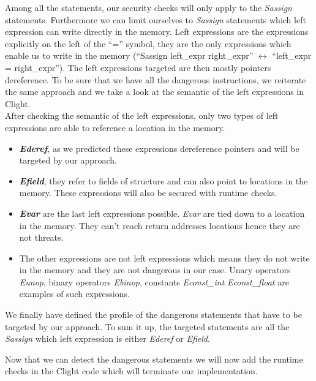 \documentclass[11pt]{sdm}
\begin{document}
Among all the statements, our security checks will only apply to the \textit{Sassign} statements.
Furthermore we can limit ourselves to \textit{Sassign} statements which left expression can write directly in the memory. Left expressions are the expressions explicitly on the left of the ``='' symbol, they are the only expressions which enable us to write in the memory (``Sassign left\_expr right\_expr'' $\leftrightarrow$ ``left\_expr = right\_expr''). The left expressions targeted are then mostly pointers dereference. To be sure that we have all the dangerous instructions, we reiterate the same approach and we take a look at the semantic of the left expressions in Clight.\\
After checking the semantic of the left expressions, only two types of left expressions are able to reference a location in the memory.

\begin{itemize}
	\item \textbf{\textit{Ederef}}, as we predicted these expressions dereference pointers and will be targeted by our approach.
	\item \textbf{\textit{Efield}}, they refer to fields of structure and can also point to locations in the memory. These expressions will also be secured with runtime checks.
	\item \textbf{\textit{Evar}} are the last left expressions possible. \textit{Evar} are tied down to a location in the memory. They can't reach return addresses locations hence they are not threats.
	\item The other expressions are not left expressions which means they do not write in the memory and they are not dangerous in our case. Unary operators \textit{Eunop}, binary operators \textit{Ebinop}, constants \textit{Econst\_int} \textit{Econst\_float} are examples of such expressions.
\end{itemize}

We finally have defined the profile of the dangerous statements that have to be targeted by our approach. To sum it up, the targeted statements are all the \textit{Sassign} which left expression is either \textit{Ederef} or \textit{Efield}.

Now that we can detect the dangerous statements we will now add the runtime checks in the Clight code which will terminate our implementation.
\end{document}
